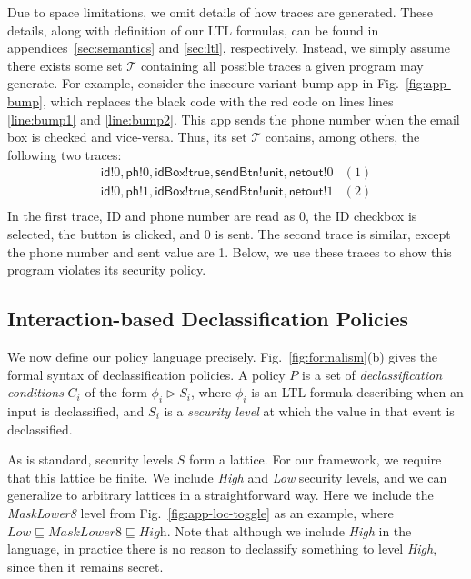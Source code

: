 \documentclass{llncs}
\newcommand{\code}[1]{\textsf{#1}} %
\newcommand{\tset}{\ensuremath{\mathcal{T}}\xspace}
\begin{document}
Due to space limitations, we omit details of how traces are
generated.  These details, along with definition of our LTL 
formulas, can be found in appendices~\ref{sec:semantics} and
\ref{sec:ltl}, respectively.
Instead, we simply assume there exists some set
$\tset$ containing all possible traces a given program may
generate.
For example, consider the insecure variant bump app in
Fig.~\ref{fig:app-bump}, which replaces the black code with the red
code on lines lines \ref{line:bump1}
and \ref{line:bump2}.  This app sends the phone number when the
email box is checked and vice-versa. Thus, its set $\tset$
contains, among others, the following two traces:
\begin{displaymath}
  \begin{array}{cl}
    \code{id}!0, \code{ph}!0, \code{idBox}!\code{true},
    \code{sendBtn}!\code{unit}, \code{netout}!0 & (1) \\
    \code{id}!0, \code{ph}!1, \code{idBox}!\code{true},
    \code{sendBtn}!\code{unit}, \code{netout}!1 & (2) \\
  \end{array}
\end{displaymath}%
\lstset{language=Java}%
In the first trace, ID and phone number are read as 0, the
ID checkbox is selected, the button is clicked, and 0 is sent.
The second trace is similar, except the phone number and sent value
are 1. Below, we use these traces to show this program
violates its security policy.

\subsection{Interaction-based Declassification Policies}
\label{sec:policies}

We now define our policy language precisely.
Fig.~\ref{fig:formalism}(b) gives the formal syntax of
declassification policies.  A policy $P$ is a set of
\emph{declassification conditions} $C_i$ of the form $\phi_i\rhd S_i$,
where $\phi_i$ is an LTL formula describing when an input is
declassified, and $S_i$ is a \emph{security level} at which the value
in that event is declassified.

As is standard, security levels $S$ form a lattice.  For our
framework, we require that this lattice be finite.  We include
\textit{High} and \textit{Low} security levels, and we can generalize
to arbitrary lattices in a straightforward way. Here we include the
\textit{MaskLower8} level from Fig.~\ref{fig:app-loc-toggle} as an
example, where $\textit{Low} \sqsubseteq \textit{MaskLower8}
\sqsubseteq \textit{High}$.  Note that although we include
\textit{High} in the language, in practice there is no reason to
declassify something to level \textit{High}, since then it remains
secret.
\end{document}
